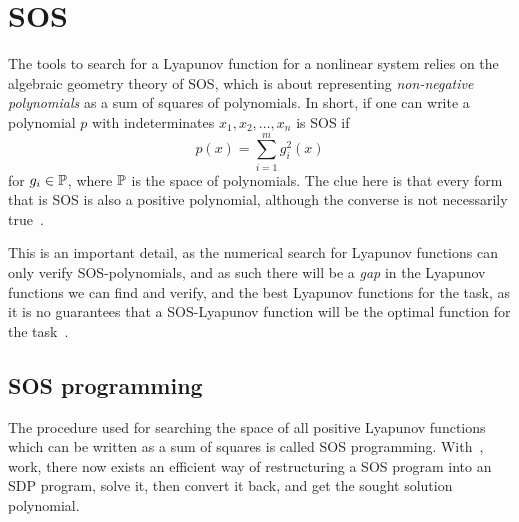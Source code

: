 \section{SOS}

The tools to search for a Lyapunov function for a nonlinear system relies on the
algebraic geometry theory of \ac{SOS}, which is about representing
\textit{non-negative polynomials} as a sum of squares of polynomials. In short,
if one can write a polynomial \(p\) with indeterminates \(x_1,x_2,\ldots,x_n\)
is \ac{SOS} if
\[
  p(x) = \sum_{i=1}^{m}g_i^2(x)
\]
for \(g_i \in \P\), where \(\P\) is the space of polynomials. The clue here is
that every form that is \ac{SOS} is also a positive polynomial, although the
converse is not necessarily true~\cite{majumdarFunnelLibrariesRealtime2017}.

This is an important detail, as the numerical search for Lyapunov functions can
only verify \ac{SOS}-polynomials, and as such there will be a \textit{gap} in
the Lyapunov functions we can find and verify, and the best Lyapunov functions
for the task, as it is no guarantees that a \ac{SOS}-Lyapunov function will be
the optimal function for the task~\cite{parilloStructuredSemidefinitePrograms}.

\subsection{SOS programming}

The procedure used for searching the space of all positive Lyapunov functions
which can be written as a sum of squares is called \ac{SOS} programming.
With~\cite[Parillo's]{parilloStructuredSemidefinitePrograms}, work, there now
exists an efficient way of restructuring a \ac{SOS} program into an \ac{SDP}
program, solve it, then convert it back, and get the sought solution polynomial.

